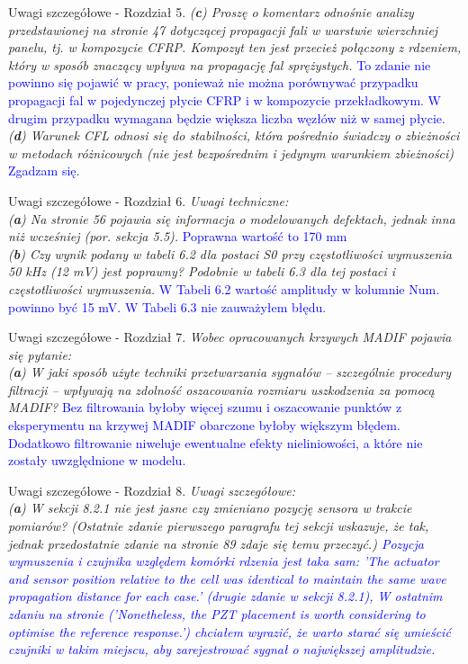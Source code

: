 \documentclass[10pt,aspectratio=169]{beamer} %
\begin{document}
\begin{frame}[label=frame4]{Uwagi szczegółowe - Rozdział 5.}\justifying
\textit{(\textbf{c}) Proszę o komentarz odnośnie analizy przedstawionej na stronie 47 dotyczącej propagacji fali w warstwie wierzchniej panelu, tj. w kompozycie CFRP. Kompozyt ten jest przecież połączony z rdzeniem, który w sposób znaczący wpływa na propagację fal sprężystych.} \textcolor{blue}{To zdanie nie powinno się pojawić w pracy, ponieważ nie można porównywać przypadku propagacji fal w pojedynczej płycie CFRP i w kompozycie przekładkowym. W drugim przypadku wymagana będzie większa liczba węzłów niż w samej płycie.}
\textit{(\textbf{d}) Warunek CFL odnosi się do stabilności, która pośrednio świadczy o zbieżności w metodach różnicowych (nie jest bezpośrednim i jedynym warunkiem zbieżności)} \textcolor{blue}{Zgadzam się.}
\end{frame}
\begin{frame}[label=frame4]{Uwagi szczegółowe - Rozdział 6.}\justifying
\textit{Uwagi techniczne:\\ (\textbf{a}) Na stronie 56 pojawia się informacja o modelowanych defektach, jednak inna niż	wcześniej (por. sekcja 5.5).} \textcolor{blue}{Poprawna wartość to 170 mm}\\
\textit{(\textbf{b}) Czy wynik podany w tabeli 6.2 dla postaci S0 przy częstotliwości wymuszenia 50 kHz (12 mV) jest poprawny? Podobnie w tabeli 6.3 dla tej postaci i częstotliwości wymuszenia.} \textcolor{blue}{W Tabeli 6.2 wartość amplitudy w kolumnie Num. powinno być 15 mV. W Tabeli 6.3 nie zauważyłem błędu.}
\end{frame}
\begin{frame}[label=frame4]{Uwagi szczegółowe - Rozdział 7.}\justifying
\textit{Wobec opracowanych krzywych MADIF pojawia się pytanie:\\
(\textbf{a}) W jaki sposób użyte techniki przetwarzania sygnałów – szczególnie procedury filtracji – wpływają na zdolność oszacowania rozmiaru uszkodzenia za pomocą MADIF?}
\textcolor{blue}{Bez filtrowania byłoby więcej szumu i oszacowanie punktów z eksperymentu na krzywej MADIF obarczone byłoby większym błędem. Dodatkowo filtrowanie niweluje ewentualne efekty nieliniowości, a które nie zostały uwzględnione w modelu. }
\end{frame}
\begin{frame}[label=frame4]{Uwagi szczegółowe - Rozdział 8.}\justifying
\textit{Uwagi szczegółowe:\\
\textit{(\textbf{a}) W sekcji 8.2.1 nie jest jasne czy zmieniano pozycję sensora w trakcie pomiarów? (Ostatnie zdanie pierwszego paragrafu tej sekcji wskazuje, że tak, jednak przedostatnie zdanie na stronie 89 zdaje się temu przeczyć.)} \textcolor{blue}{Pozycja wymuszenia i czujnika względem komórki rdzenia jest taka sam: 'The actuator and sensor position relative to the cell was identical to maintain the same wave propagation distance for each case.' (drugie zdanie w sekcji 8.2.1), W ostatnim zdaniu na stronie ('Nonetheless, the PZT placement is worth considering to optimise the reference response.') chciałem wyrazić, że warto starać się umieścić czujniki w takim miejscu, aby zarejestrować sygnał o największej amplitudzie.}}
\end{frame}
\end{document}
